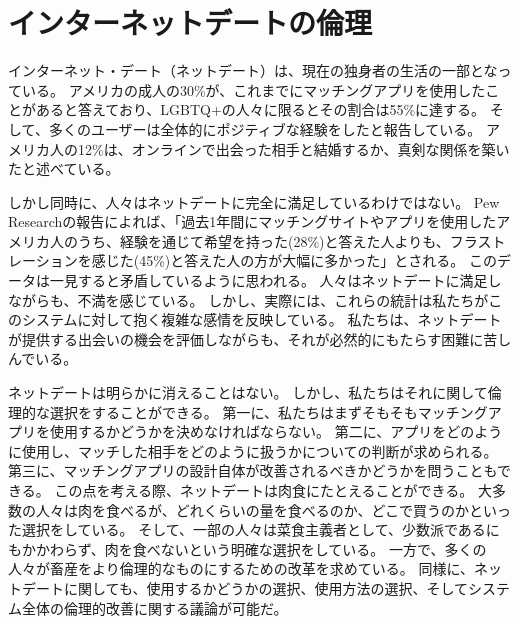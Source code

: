 \documentclass[paper=a4,book,openany]{jlreq}
\newcommand{\ig}[1]{}           %
\begin{document}
\section{インターネットデートの倫理}

インターネット・デート（ネットデート）は、現在の独身者の生活の一部となっている。
アメリカの成人の30\%が、これまでにマッチングアプリを使用したことがあると答えており、LGBTQ+の人々に限るとその割合は55\%に達する。
そして、多くのユーザーは全体的にポジティブな経験をしたと報告している。
アメリカ人の12\%は、オンラインで出会った相手と結婚するか、真剣な関係を築いたと述べている\citep{anderson20:_virt_down_onlin_datin}。
\ig{Monica Anderson}

しかし同時に、人々はネットデートに完全に満足しているわけではない。
Pew Researchの報告によれば、「過去1年間にマッチングサイトやアプリを使用したアメリカ人のうち、経験を通じて希望を持った(28\%)と答えた人よりも、フラストレーションを感じた(45\%)と答えた人の方が大幅に多かった」とされる\citep{anderson20:_virt_down_onlin_datin}。
このデータは一見すると矛盾しているように思われる。
人々はネットデートに満足しながらも、不満を感じている。
しかし、実際には、これらの統計は私たちがこのシステムに対して抱く複雑な感情を反映している。
私たちは、ネットデートが提供する出会いの機会を評価しながらも、それが必然的にもたらす困難に苦しんでいる。

ネットデートは明らかに消えることはない。
しかし、私たちはそれに関して倫理的な選択をすることができる。
第一に、私たちはまずそもそもマッチングアプリを使用するかどうかを決めなければならない。
第二に、アプリをどのように使用し、マッチした相手をどのように扱うかについての判断が求められる。
第三に、マッチングアプリの設計自体が改善されるべきかどうかを問うこともできる。
この点を考える際、ネットデートは肉食にたとえることができる。
大多数の人々は肉を食べるが、どれくらいの量を食べるのか、どこで買うのかといった選択をしている。
そして、一部の人々は菜食主義者として、少数派であるにもかかわらず、肉を食べないという明確な選択をしている。
一方で、多くの人々が畜産をより倫理的なものにするための改革を求めている。
同様に、ネットデートに関しても、使用するかどうかの選択、使用方法の選択、そしてシステム全体の倫理的改善に関する議論が可能だ。
\end{document}
